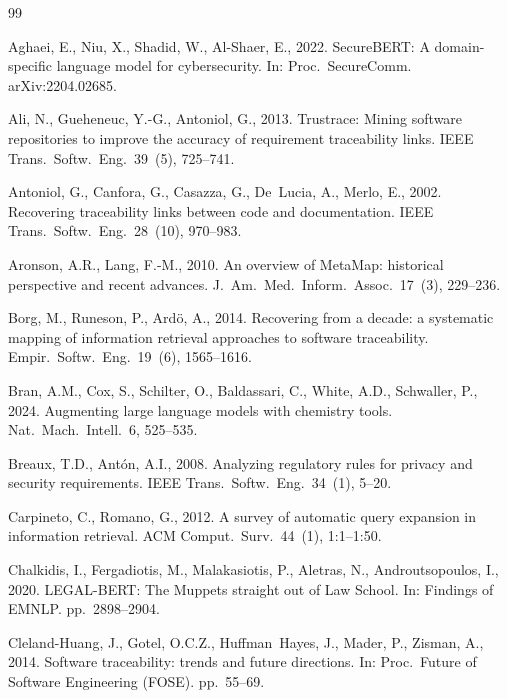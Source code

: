 \documentclass[a4paper,fleqn]{cas-sc}
\begin{document}
\begin{thebibliography}{99}

Aghaei, E., Niu, X., Shadid, W., Al-Shaer, E., 2022. SecureBERT: A domain-specific language model for cybersecurity. In: Proc.\ SecureComm. arXiv:2204.02685.

Ali, N., Gueheneuc, Y.-G., Antoniol, G., 2013. Trustrace: Mining software repositories to improve the accuracy of requirement traceability links. IEEE Trans.\ Softw.\ Eng.\ 39~(5), 725--741.

Antoniol, G., Canfora, G., Casazza, G., De~Lucia, A., Merlo, E., 2002. Recovering traceability links between code and documentation. IEEE Trans.\ Softw.\ Eng.\ 28~(10), 970--983.

Aronson, A.R., Lang, F.-M., 2010. An overview of MetaMap: historical perspective and recent advances. J.\ Am.\ Med.\ Inform.\ Assoc.\ 17~(3), 229--236.

Borg, M., Runeson, P., Ard\"o, A., 2014. Recovering from a decade: a systematic mapping of information retrieval approaches to software traceability. Empir.\ Softw.\ Eng.\ 19~(6), 1565--1616.

Bran, A.M., Cox, S., Schilter, O., Baldassari, C., White, A.D., Schwaller, P., 2024. Augmenting large language models with chemistry tools. Nat.\ Mach.\ Intell.\ 6, 525--535.

Breaux, T.D., Ant\'on, A.I., 2008. Analyzing regulatory rules for privacy and security requirements. IEEE Trans.\ Softw.\ Eng.\ 34~(1), 5--20.

Carpineto, C., Romano, G., 2012. A survey of automatic query expansion in information retrieval. ACM Comput.\ Surv.\ 44~(1), 1:1--1:50.

Chalkidis, I., Fergadiotis, M., Malakasiotis, P., Aletras, N., Androutsopoulos, I., 2020. LEGAL-BERT: The Muppets straight out of Law School. In: Findings of EMNLP. pp.\ 2898--2904.

Cleland-Huang, J., Gotel, O.C.Z., Huffman~Hayes, J., Mader, P., Zisman, A., 2014. Software traceability: trends and future directions. In: Proc.\ Future of Software Engineering (FOSE). pp.\ 55--69.


\end{thebibliography}
\end{document}
